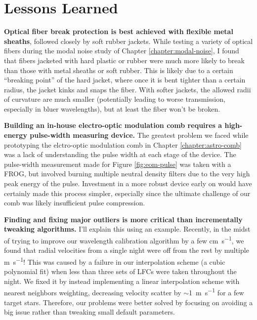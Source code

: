 \section{Lessons Learned} \label{conclusion:lessons}

\textbf{Optical fiber break protection is best achieved with flexible metal sheaths}, followed closely by soft rubber jackets. While testing a variety of optical fibers during the modal noise study of Chapter \ref{chapter:modal-noise}, I found that fibers jacketed with hard plastic or rubber were much more likely to break than those with metal sheaths or soft rubber. This is likely due to a certain ``breaking point'' of the hard jacket, where once it is bent tighter than a certain radius, the jacket kinks and snaps the fiber. With softer jackets, the allowed radii of curvature are much smaller (potentially leading to worse transmission, especially in bluer wavelengths), but at least the fiber won't be broken.

\textbf{Building an in-house electro-optic modulation comb requires a high-energy pulse-width measuring device.} The greatest problem we faced while prototyping the elctro-optic modulation comb in Chapter \ref{chapter:astro-comb} was a lack of understanding the pulse width at each stage of the device. The pulse-width measurement made for Figure \ref{fig:eom-pulse} was taken with a FROG, but involved burning multiple neutral density filters due to the very high peak energy of the pulse. Investment in a more robust device early on would have certainly made this process simpler, especially since the ultimate challenge of our comb was likely insufficient pulse compression.

\textbf{Finding and fixing major outliers is more critical than incrementally tweaking algorithms.} I'll explain this using an example. Recently, in the midst of trying to improve our wavelength calibration algorithm by a few \si{\centi\meter\per\second}, we found that radial velocities from a single night were off from the rest by multiple \si{\meter\per\second}! This was caused by a failure in our interpolation scheme (a cubic polynomial fit) when less than three sets of LFCs were taken throughout the night. We fixed it by instead implementing a linear interpolation scheme with nearest neighbors weighting, decreasing velocity scatter by $\sim$1~\si{\meter\per\second} for a few target stars. Therefore, our problems were better solved by focusing on avoiding a big issue rather than tweaking small default parameters.

